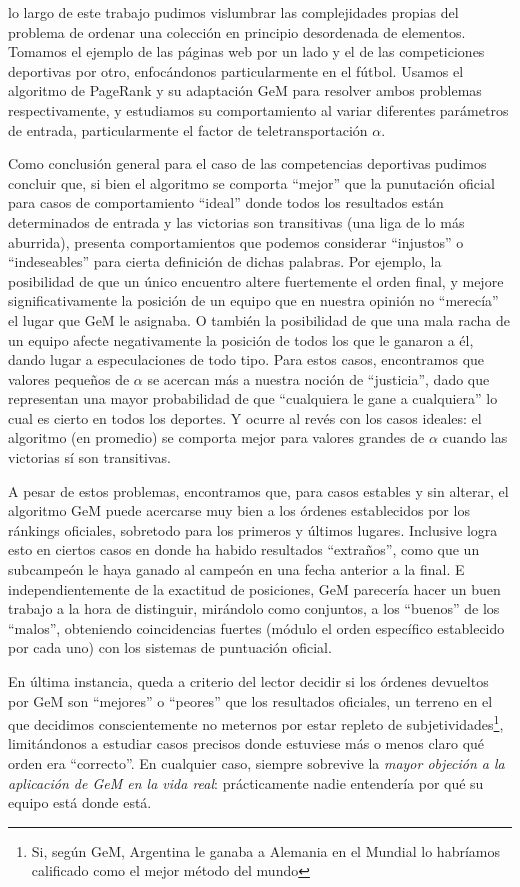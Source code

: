  lo largo de este trabajo pudimos vislumbrar las complejidades propias del problema de ordenar una colección en principio desordenada de elementos. Tomamos el ejemplo de las páginas web por un lado y el de las competiciones deportivas por otro, enfocándonos particularmente en el fútbol. Usamos el algoritmo de PageRank y su adaptación GeM para resolver ambos problemas respectivamente, y estudiamos su comportamiento al variar diferentes parámetros de entrada, particularmente el factor de teletransportación $\alpha$.

Como conclusión general para el caso de las competencias deportivas pudimos concluir que, si bien el algoritmo se comporta ``mejor'' que la punutación oficial para casos de comportamiento ``ideal'' donde todos los resultados están determinados de entrada y las victorias son transitivas (una liga de lo más aburrida), presenta comportamientos que podemos considerar ``injustos'' o ``indeseables'' para cierta definición de dichas palabras. Por ejemplo, la posibilidad de que un único encuentro altere fuertemente el orden final, y mejore significativamente la posición de un equipo que en nuestra opinión no ``merecía'' el lugar que GeM le asignaba. O también la posibilidad de que una mala racha de un equipo afecte negativamente la posición de todos los que le ganaron a él, dando lugar a especulaciones de todo tipo. Para estos casos, encontramos que valores pequeños de $\alpha$ se acercan más a nuestra noción de ``justicia'', dado que representan una mayor probabilidad de que ``cualquiera le gane a cualquiera'' lo cual es cierto en todos los deportes. Y ocurre al revés con los casos ideales: el algoritmo (en promedio) se comporta mejor para valores grandes de $\alpha$ cuando las victorias sí son transitivas.

A pesar de estos problemas, encontramos que, para casos estables y sin alterar, el algoritmo GeM puede acercarse muy bien a los órdenes establecidos por los ránkings oficiales, sobretodo para los primeros y últimos lugares. Inclusive logra esto en ciertos casos en donde ha habido resultados ``extraños'', como que un subcampeón le haya ganado al campeón en una fecha anterior a la final. E independientemente de la exactitud de posiciones, GeM parecería hacer un buen trabajo a la hora de distinguir, mirándolo como conjuntos, a los ``buenos'' de los ``malos'', obteniendo coincidencias fuertes (módulo el orden específico establecido por cada uno) con los sistemas de puntuación oficial.

En última instancia, queda a criterio del lector decidir si los órdenes devueltos por GeM son ``mejores'' o ``peores'' que los resultados oficiales, un terreno en el que decidimos conscientemente no meternos por estar repleto de subjetividades\footnote{Si, según GeM, Argentina le ganaba a Alemania en el Mundial lo habríamos calificado como el mejor método del mundo}, limitándonos a estudiar casos precisos donde estuviese más o menos claro qué orden era ``correcto''. En cualquier caso, siempre sobrevive la \emph{mayor objeción a la aplicación de GeM en la vida real}: prácticamente nadie entendería por qué su equipo está donde está.